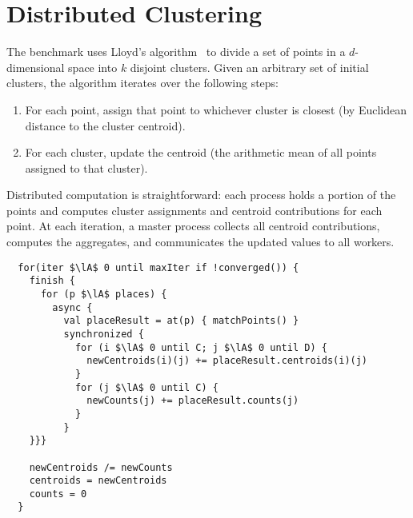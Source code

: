 \section{Distributed \kmeans Clustering}
\label{sec:kmeans}

The \kmeans benchmark uses Lloyd's algorithm~\cite{Lloyd1982Least} to divide a
set of points in a $d$-dimensional space into $k$ disjoint clusters.  Given an
arbitrary set of initial clusters, the algorithm iterates over the following
steps:
\begin{enumerate}
  \item For each point, assign that point to whichever cluster is closest (by
Euclidean distance to the cluster centroid).
  \item For each cluster, update the centroid (the arithmetic mean of all
points assigned to that cluster).
\end{enumerate}
Distributed computation is straightforward: each process holds a portion of the
points and computes cluster assignments and centroid contributions for each
point. At each iteration, a master process collects all centroid contributions,
computes the aggregates, and communicates the updated values to all workers.

\begin{lstlisting}
  for(iter $\lA$ 0 until maxIter if !converged()) {
    finish {
      for (p $\lA$ places) {
        async {
          val placeResult = at(p) { matchPoints() }
          synchronized {
            for (i $\lA$ 0 until C; j $\lA$ 0 until D) {
              newCentroids(i)(j) += placeResult.centroids(i)(j)
            }
            for (j $\lA$ 0 until C) {
              newCounts(j) += placeResult.counts(j)
            }
          }
    }}}

    newCentroids /= newCounts
    centroids = newCentroids
    counts = 0
  }
\end{lstlisting}

% 
% 
% 
